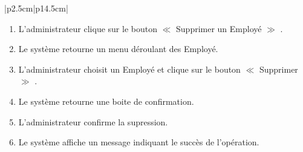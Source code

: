 \documentclass[11pt]{report}
\begin{document}
\begin{table}[h]
\begin{tabular}{|p{2.5cm}|p{14.5cm}|}
{\begin{enumerate}
      \item \begin{Large} L'administrateur clique sur le bouton $\ll$ Supprimer un Employé $\gg$ .\end{Large}
      \item \begin{Large} Le système retourne un menu déroulant des Employé.\end{Large}
      \item \begin{Large} L'administrateur choisit un Employé et clique sur le bouton $\ll$ Supprimer $\gg$ .\end{Large}
      \item \begin{Large} Le système retourne une boite de confirmation.\end{Large}
      \item \begin{Large} L'administrateur confirme la supression.\end{Large}
      \item \begin{Large} Le système affiche un message indiquant le succès de l'opération.\end{Large}
      
   \end{enumerate}} \\
   \hline
    \\
   \hline
    \\
   \hline
\end{tabular}
\caption{Description textuelle du cas d'utilisation $\ll$ Supprimer un Utilisateur $\gg$}
\end{table}
\end{document}
